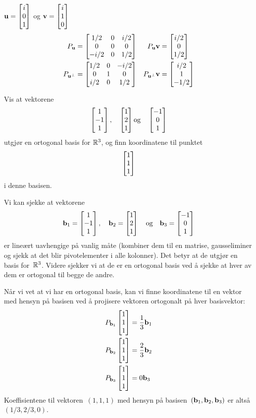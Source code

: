 \begin{losning}
\begin{punkt}
$\mathbf{u}=\begin{bmatrix} i \\ 0 \\ 1 \end{bmatrix}$ og $\mathbf{v}=\begin{bmatrix} i \\ 1 \\ 0 \end{bmatrix}$\\[4pt]
\vspace{-15pt}
\begin{align*}
P_{\mathbf{u}}
&=
\begin{bmatrix}
1/2  & 0 & i/2 \\
0    & 0 & 0   \\
-i/2 & 0 & 1/2
\end{bmatrix}
&
P_{\mathbf{u}} \mathbf{v} &= \begin{bmatrix} i/2 \\ 0 \\ 1/2 \end{bmatrix}
\\
P_{\mathbf{u}^\perp}
&=
\begin{bmatrix}
1/2  & 0 & -i/2 \\
0    & 1 & 0    \\
i/2  & 0 & 1/2
\end{bmatrix}
&
P_{\mathbf{u}^\perp} \mathbf{v} &= \begin{bmatrix} i/2 \\ 1 \\ -1/2 \end{bmatrix}
\end{align*}
\end{punkt}
\end{losning}


\begin{oppgave}
Vis at vektorene 
\[
\begin{bmatrix} 1 \\ -1 \\ 1 \end{bmatrix}, \quad \begin{bmatrix} 1 \\ 2 \\ 1 \end{bmatrix} \text{og} \quad \begin{bmatrix} -1 \\ 0 \\ 1 \end{bmatrix}
\]
utgjør en ortogonal basis for $\mathbb{R}^3$, og finn koordinatene til punktet
\[
\begin{bmatrix} 1 \\ 1 \\ 1 \end{bmatrix}
\]
i denne basisen.
\end{oppgave}


\begin{losning}
Vi kan sjekke at vektorene
\[
\mathbf{b}_1 = \begin{bmatrix} 1 \\ -1 \\ 1 \end{bmatrix}, \quad \mathbf{b}_2 = \begin{bmatrix} 1 \\ 2 \\ 1 \end{bmatrix} \quad \text{og} \quad \mathbf{b}_3 = \begin{bmatrix} -1 \\ 0 \\ 1 \end{bmatrix}
\]
er lineært uavhengige på vanlig måte
(kombiner dem til en matrise, gausseliminer og sjekk at det blir
pivotelementer i alle kolonner).  Det betyr at de utgjør en basis
for~$\mathbb{R}^3$.  Videre sjekker vi at de er en ortogonal basis ved å
sjekke at hver av dem er ortogonal til begge de andre.

Når vi vet at vi har en ortogonal basis, kan vi finne koordinatene til
en vektor med hensyn på basisen ved å projisere vektoren ortogonalt på
hver basisvektor:
\begin{align*}
P_{\mathbf{b}_1} \begin{bmatrix} 1 \\ 1 \\ 1 \end{bmatrix} &= \frac{1}{3} \mathbf{b}_1 \\
P_{\mathbf{b}_2} \begin{bmatrix} 1 \\ 1 \\ 1 \end{bmatrix} &= \frac{2}{3} \mathbf{b}_2 \\
P_{\mathbf{b}_3} \begin{bmatrix} 1 \\ 1 \\ 1 \end{bmatrix} &= 0 \mathbf{b}_3
\end{align*}
Koeffisientene til vektoren~$(1,1,1)$ med hensyn på
basisen~$(\mathbf{b}_1,\mathbf{b}_2,\mathbf{b}_3)$ er altså $(1/3,2/3,0)$.
\end{losning}


